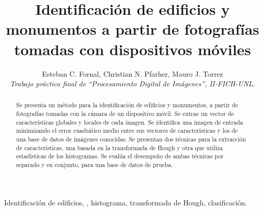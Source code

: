 \documentclass[conference,a4paper,10pt,oneside,final]{tfmpd}
\begin{document}
\title{Identificación de edificios y monumentos a partir de fotografías
tomadas con dispositivos móviles}
\author{Esteban C. Fornal, Christian N. Pfarher, Mauro J. Torrez\\
\textit{Trabajo práctico final de ``Procesamiento Digital de
Imágenes'', II-FICH-UNL.}}
\maketitle
%
%
%
%
\begin{abstract}
Se presenta un método para la identificación de edificios y monumentos, a
partir de fotografías tomadas con la cámara de un dispositivo móvil.
Se extrae un vector de características {globales y locales} de cada imagen.
{Se identifica una imagen de entrada minimizando el error cuadrático medio
entre sus vectores de características y los de una base de datos de imágenes
conocidas.}
Se presentan dos técnicas para la extracción de
características, una basada en la transformada de Hough y otra que
utiliza estadísticas de los histogramas.
Se evalúa el desempeño %
de ambas técnicas por separado y en
conjunto, para una base de datos de prueba.
\end{abstract}
%
%
%
%
\begin{keywords}
Identificación de edificios, ,
histograma, transformada de Hough, clasificación.
\end{keywords}
%
%
%
%
\end{document}
